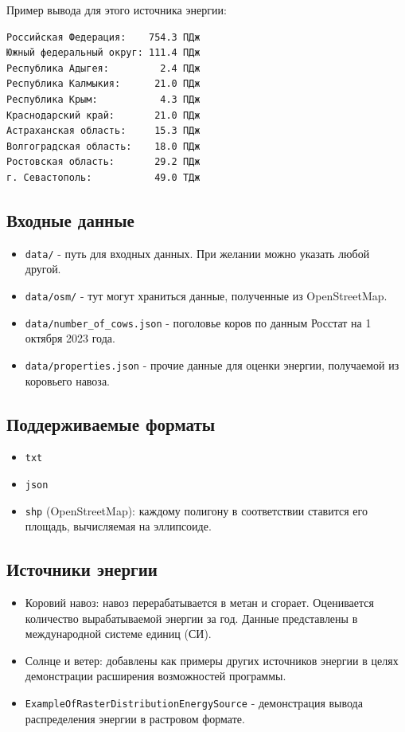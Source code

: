 \documentclass[12pt,a4paper]{scrartcl}
\begin{document}
Пример вывода для этого источника энергии:

\begin{verbatim}
Российская Федерация:    754.3 ПДж
Южный федеральный округ: 111.4 ПДж
Республика Адыгея:         2.4 ПДж
Республика Калмыкия:      21.0 ПДж
Республика Крым:           4.3 ПДж
Краснодарский край:       21.0 ПДж
Астраханская область:     15.3 ПДж
Волгоградская область:    18.0 ПДж
Ростовская область:       29.2 ПДж
г. Севастополь:           49.0 ТДж
\end{verbatim}

\subsection{Входные данные}
\label{sec:desc:inpd}

\begin{itemize}
  \item \texttt{data/} - путь для входных данных. При желании можно указать любой другой.
  \item \texttt{data/osm/} - тут могут храниться данные, полученные из OpenStreetMap.
  \item \texttt{data/number\_of\_cows.json} - поголовье коров по данным Росстат на 1 октября 2023 года.
  \item \texttt{data/properties.json} - прочие данные для оценки энергии, получаемой из коровьего навоза.
\end{itemize}

\subsection{Поддерживаемые форматы}
\label{sec:desc:fs}

\begin{itemize}
  \item \texttt{txt}
  \item \texttt{json}
  \item \texttt{shp} (OpenStreetMap): каждому полигону в соответствии ставится его площадь, вычисляемая на эллипсоиде.
\end{itemize}

\subsection{Источники энергии}
\label{sec:desc:es}
\begin{itemize}
  \item Коровий навоз: навоз перерабатывается в метан и сгорает. Оценивается количество вырабатываемой энергии за год. Данные представлены в международной системе единиц (СИ).
  \item Солнце и ветер: добавлены как примеры других источников энергии в целях демонстрации расширения возможностей программы.
  \item \texttt{ExampleOfRasterDistributionEnergySource} - демонстрация вывода распределения энергии в растровом формате.
\end{itemize}
\end{document}
